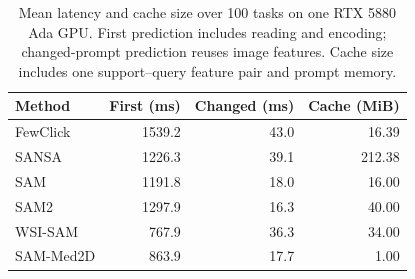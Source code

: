 \begin{table}[t]
\centering
\caption{Mean latency and cache size over 100 tasks on one RTX 5880 Ada GPU. First prediction includes reading and encoding; changed-prompt prediction reuses image features. Cache size includes one support--query feature pair and prompt memory.}
\label{tab:efficiency}
\small
\setlength{\tabcolsep}{4pt}
\begin{tabular}{@{}lrrr@{}}
\toprule
Method & First (ms) & Changed (ms) & Cache (MiB) \\
\midrule
FewClick & 1539.2 & 43.0 & 16.39 \\
SANSA & 1226.3 & 39.1 & 212.38 \\
SAM & 1191.8 & 18.0 & 16.00 \\
SAM2 & 1297.9 & 16.3 & 40.00 \\
WSI-SAM & 767.9 & 36.3 & 34.00 \\
SAM-Med2D & 863.9 & 17.7 & 1.00 \\
\bottomrule
\end{tabular}
\end{table}
